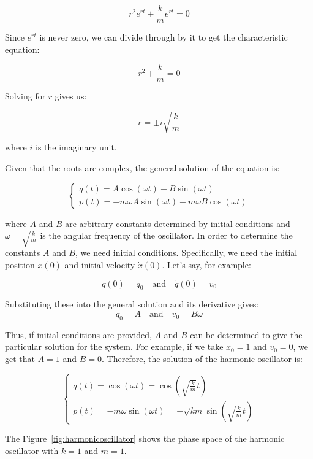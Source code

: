 \documentclass{article}
\begin{document}
\[
	r^2 e^{rt} + \frac{k}{m} e^{rt} = 0
\]

Since \( e^{rt} \) is never zero, we can divide through by it to get the characteristic equation:

\[
	r^2 + \frac{k}{m} = 0
\]

Solving for \( r \) gives us:

\[
	r = \pm i \sqrt{\frac{k}{m}}
\]

where \( i \) is the imaginary unit.

Given that the roots are complex, the general solution of the equation is:

\[
	\begin{cases}
		q(t) = A \cos(\omega t) + B \sin(\omega t) \\
		p(t) = -m \omega A \sin(\omega t) + m \omega B \cos(\omega t)
	\end{cases}
\]

where \( A \) and \( B \) are arbitrary constants determined by initial conditions and \( \omega = \sqrt{\frac{k}{m}} \) is the angular frequency of the oscillator. In order to determine the constants \( A \) and \( B \), we need initial conditions. Specifically, we need the initial position \( x(0) \) and initial velocity \( \dot{x}(0) \). Let's say, for example:

\[
q(0) = q_0 \quad \text{and} \quad \dot{q}(0) = v_0
\]

Substituting these into the general solution and its derivative gives:
\[
q_0 = A \quad \text{and} \quad v_0 = B \omega
\]

Thus, if initial conditions are provided, \( A \) and \( B \) can be determined to give the particular solution for the system. For example, if we take \(x_0 = 1\) and \(v_0 = 0\), we get that \(A = 1\) and \(B = 0\). Therefore, the solution of the harmonic oscillator is:

\[
	\begin{cases}
		q(t) = \cos(\omega t) = \cos(\sqrt{\frac{k}{m}} t) \\
		p(t) = -m \omega \sin(\omega t) = -\sqrt{km} \sin(\sqrt{\frac{k}{m}} t)
	\end{cases}
\]

The Figure~\ref{fig:harmonicoscillator} shows the phase space of the harmonic oscillator with \(k = 1\) and \(m = 1\).
\end{document}
